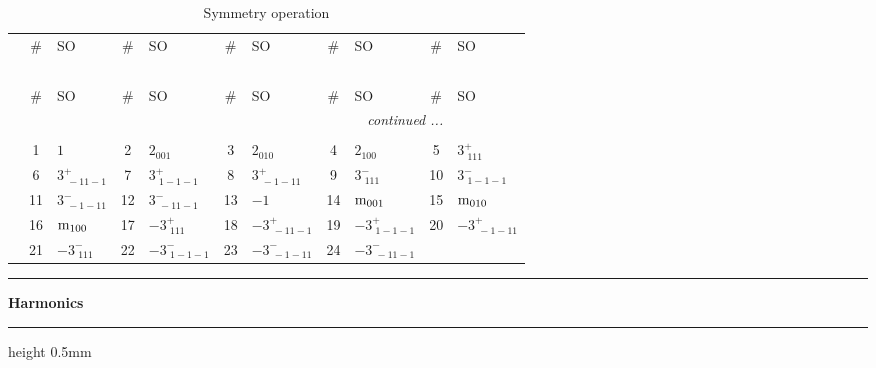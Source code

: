 \documentclass[fleqn,10pt,landscape]{jsarticle}
\begin{document}
\renewcommand{\arraystretch}{1.6}
\begin{longtable}[l]{c|cl|cl|cl|cl|cl}
\captionsetup{justification=raggedright, singlelinecheck=off}
\caption{Symmetry operation}
 \\
 \hline \hline
 & \# & SO & \# & SO & \# & SO & \# & SO & \# & SO \\ \hline \endfirsthead

\multicolumn{10}{l}{\tablename\ \thetable{}} \\
 \hline \hline
 & \# & SO & \# & SO & \# & SO & \# & SO & \# & SO \\ \hline \endhead

 \hline \hline
\multicolumn{10}{r}{\footnotesize\it continued ...} \\ \endfoot

 \hline \hline
\multicolumn{10}{r}{} \\ \endlastfoot

 & 1 & $1$ & 2 & $2{}_{001}$ & 3 & $2{}_{010}$ & 4 & $2{}_{100}$ & 5 & $3^{+}_{\,\,111}$ \\
& 6 & $3^{+}_{\,\,-11-1}$ & 7 & $3^{+}_{\,\,1-1-1}$ & 8 & $3^{+}_{\,\,-1-11}$ & 9 & $3^{-}_{\,\,111}$ & 10 & $3^{-}_{\,\,1-1-1}$ \\
& 11 & $3^{-}_{\,\,-1-11}$ & 12 & $3^{-}_{\,\,-11-1}$ & 13 & $-1$ & 14 & ${\rm m}_{001}$ & 15 & ${\rm m}_{010}$ \\
& 16 & ${\rm m}_{100}$ & 17 & $-3^{+}_{\,\,111}$ & 18 & $-3^{+}_{\,\,-11-1}$ & 19 & $-3^{+}_{\,\,1-1-1}$ & 20 & $-3^{+}_{\,\,-1-11}$ \\
& 21 & $-3^{-}_{\,\,111}$ & 22 & $-3^{-}_{\,\,1-1-1}$ & 23 & $-3^{-}_{\,\,-1-11}$ & 24 & $-3^{-}_{\,\,-11-1}$ &  &  \\
\end{longtable}
\vspace{5mm}
\noindent \rule[0.5mm]{5mm}{0.5mm}\hspace{3mm}\textbf{Harmonics}\hspace{3mm}\leaders\hrule height 0.5mm\hfill\kern0pt
\vspace{3mm}
\end{document}
